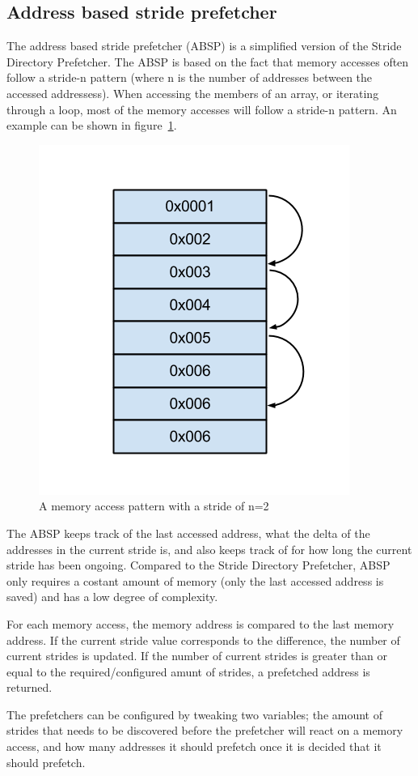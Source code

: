 \subsection{Address based stride prefetcher}
\label{sec:stridePrefetcher}
The address based stride prefetcher (ABSP) is a simplified version of the Stride Directory Prefetcher. The ABSP is based on the fact that memory accesses
often follow a stride-n pattern (where n is the number of addresses between
the accessed addressess). When accessing the members of an
array, or iterating through a loop, most of the memory accesses will
follow a stride-n pattern. An example can be shown in figure~\ref{fig:stride}.

\begin{figure}[H]
\label{fig:stride}
\centerline{\includegraphics[scale=0.5]{./figures/stride}}
\caption{A memory access pattern with a stride of n=2}
\end{figure}

The ABSP keeps track of the last accessed address, what the delta of the addresses in the current stride is, and
also keeps track of for how long the current stride has been
ongoing. Compared to the Stride Directory Prefetcher, ABSP only requires a costant amount of memory (only the last accessed address is saved) and has a low degree of complexity.

For each memory access, the memory address is compared to the last
memory address. If the current stride value corresponds to the
difference, the number of current strides is updated. If the number of
current strides is greater than or equal to the required/configured
amunt of strides, a prefetched address is returned.  

The prefetchers can be configured by tweaking two variables;
the amount of strides that needs to be discovered before
the prefetcher will react on a memory access, and how many addresses it should prefetch once it is decided that it should prefetch.

